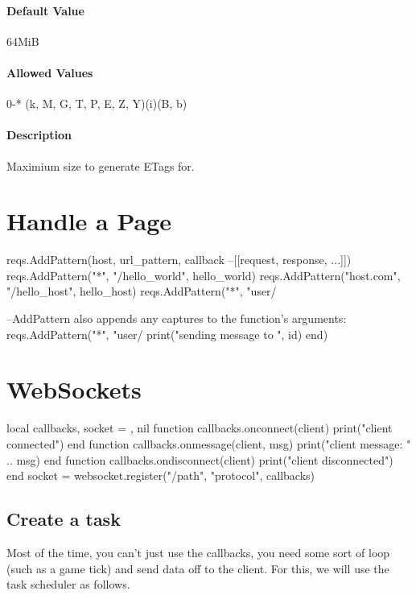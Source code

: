 \documentclass[a4paper,11pt]{report}
\begin{document}
\subsubsection{Default Value}{64MiB}
\subsubsection{Allowed Values}{0-* (k, M, G, T, P, E, Z, Y)(i)(B, b)}
\subsubsection{Description}{Maximium size to generate ETags for.}

\chapter{Handle a Page}

\begin{lua}
reqs.AddPattern(host, url_pattern, callback --[[request, response, ...]])
reqs.AddPattern("*", "/hello_world", hello_world)
reqs.AddPattern("host.com", "/hello_host", hello_host)
reqs.AddPattern("*", "user/%

--AddPattern also appends any captures to the function's arguments:
reqs.AddPattern("*", "user/%
	print("sending message to ", id)
end)
\end{lua}

\chapter{WebSockets}

\begin{lua}
local callbacks, socket = {}, nil
function callbacks.onconnect(client)
	print("client connected")
end
function callbacks.onmessage(client, msg)
	print("client message: " .. msg)
end
function callbacks.ondisconnect(client)
	print("client disconnected")
end
socket = websocket.register("/path", "protocol", callbacks)
\end{lua}

\section{Create a task}

Most of the time, you can't just use the callbacks, you need some sort of loop (such as a game tick) and send data off to the client.  For this, we will use the task scheduler as follows.
\end{document}
